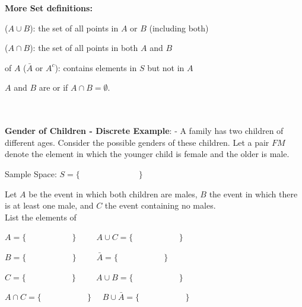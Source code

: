 \textbf{More Set definitions:}
\bi
\item \underbar{~~~~~~~~~~~~~~~~~~~~~~~~~~} ($A \cup B$): the set of all points in $A$ or $B$ (including both)\\
\item \underbar{~~~~~~~~~~~~~~~~~~~~~~~~~~} ($A \cap B$): the set of all points in both $A$ and $B$\\
\item \underbar{~~~~~~~~~~~~~~~~~~~~~~~~~~} of $A$ ($\bar{A}$ or $A^c$): contains elements in $S$ but not in $A$\\
\item $A$ and $B$ are \underbar{~~~~~~~~~~~~~~~~~~~~~~~~~~} or \underbar{~~~~~~~~~~~~~~~~~~~~~~~~~~} if $A\cap B = \emptyset$.\\~\\~\\
\ei

\textbf{Gender of Children - Discrete Example}: - A family has two children of different ages.  Consider the possible genders of these children. Let a pair $FM$ denote the element in which the younger child is female and the older is male.
\be
\item Sample Space: $S=\{~~~~~~~~~~~~~~~~~~~~~~~~~~~~~~~~\}$
\item Let $A$ be the event in which both children are males, $B$ the event in which there is at least one male, and $C$ the event containing no males.\\
List the elements of
    \bi
    \item $A=\{~~~~~~~~~~~~~~~~~~~~~~~~~\}$ $~~~~~~~~$ $A\cup C =\{~~~~~~~~~~~~~~~~~~~~~~~~~\}$\\
    \item $B=\{~~~~~~~~~~~~~~~~~~~~~~~~~\}$ $~~~~~~~~$ $\bar{A} =\{~~~~~~~~~~~~~~~~~~~~~~~~~\}$\\
    \item $C=\{~~~~~~~~~~~~~~~~~~~~~~~~~\}$ $~~~~~~~~$ $A \cup B=\{~~~~~~~~~~~~~~~~~~~~~~~~~\}$\\
    \item $A\cap C =\{~~~~~~~~~~~~~~~~~~~~~~~~~\}$ $~~~$ $B \cup \bar{A}=\{~~~~~~~~~~~~~~~~~~~~~~~~~\}$
    \ei
\ee

\newpage

